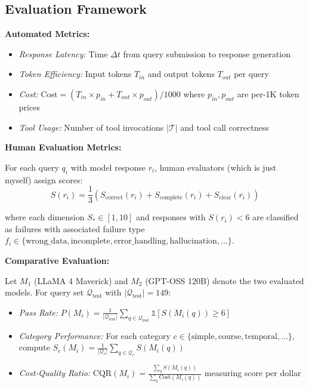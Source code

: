 \documentclass{article}
\begin{document}
\subsection{Evaluation Framework}

\textbf{Automated Metrics:}
\begin{itemize}
\item \textit{Response Latency:} Time $\Delta t$ from query submission to response generation
\item \textit{Token Efficiency:} Input tokens $T_{in}$ and output tokens $T_{out}$ per query
\item \textit{Cost:} $\text{Cost} = (T_{in} \times p_{in} + T_{out} \times p_{out})/1000$ where $p_{in}, p_{out}$ are per-1K token prices
\item \textit{Tool Usage:} Number of tool invocations $|\mathcal{T}|$ and tool call correctness
\end{itemize}

\textbf{Human Evaluation Metrics:}

For each query $q_i$ with model response $r_i$, human evaluators (which is just myself) assign scores:
\begin{equation}
S(r_i) = \frac{1}{3}(S_{\text{correct}}(r_i) + S_{\text{complete}}(r_i) + S_{\text{clear}}(r_i))
\end{equation}

where each dimension $S_* \in [1, 10]$ and responses with $S(r_i) < 6$ are classified as failures with associated failure type $f_i \in \{\text{wrong\_data}, \text{incomplete}, \text{error\_handling}, \text{hallucination}, ...\}$.

\textbf{Comparative Evaluation:}

Let $M_1$ (LLaMA 4 Maverick) and $M_2$ (GPT-OSS 120B) denote the two evaluated models. For query set $\mathcal{Q}_{\text{test}}$ with $|\mathcal{Q}_{\text{test}}| = 149$:

\begin{itemize}
\item \textit{Pass Rate:} $P(M_i) = \frac{1}{|\mathcal{Q}_{\text{test}}|} \sum_{q \in \mathcal{Q}_{\text{test}}} \mathbb{1}[S(M_i(q)) \geq 6]$
\item \textit{Category Performance:} For each category $c \in \{\text{simple}, \text{course}, \text{temporal}, ...\}$, compute $S_c(M_i) = \frac{1}{|\mathcal{Q}_c|} \sum_{q \in \mathcal{Q}_c} S(M_i(q))$
\item \textit{Cost-Quality Ratio:} $\text{CQR}(M_i) = \frac{\sum_{q} S(M_i(q))}{\sum_{q} \text{Cost}(M_i(q))}$ measuring score per dollar
\end{itemize}
\end{document}
